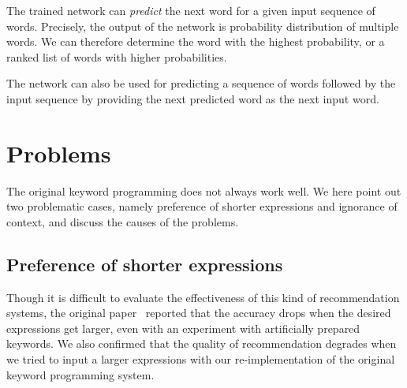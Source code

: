 \documentclass[PRO,english]{ipsj}
\begin{document}

The trained network can \emph{predict} the next word for a given input sequence of words.  Precisely, the output of the network is probability distribution of multiple words.  We can therefore determine the word with the highest probability, or a ranked list of words with higher probabilities.

The network can also be used for predicting a sequence of words followed by the input sequence by providing the next predicted word as the next input word.




\section{Problems}\label{sec:problem}

The original keyword programming does not always work well.  We here point out two problematic cases, namely preference of shorter expressions and ignorance of context, and discuss the causes of the problems.

\subsection{Preference of shorter expressions}
Though it is difficult to evaluate the effectiveness of this kind of recommendation systems, the original paper~\cite{little2009keyword} reported that the accuracy drops when the desired expressions get larger, even with an experiment with artificially prepared keywords.  We also confirmed that the quality of recommendation degrades when we tried to input a larger expressions with our re-implementation of the original keyword programming system.

\end{document}
